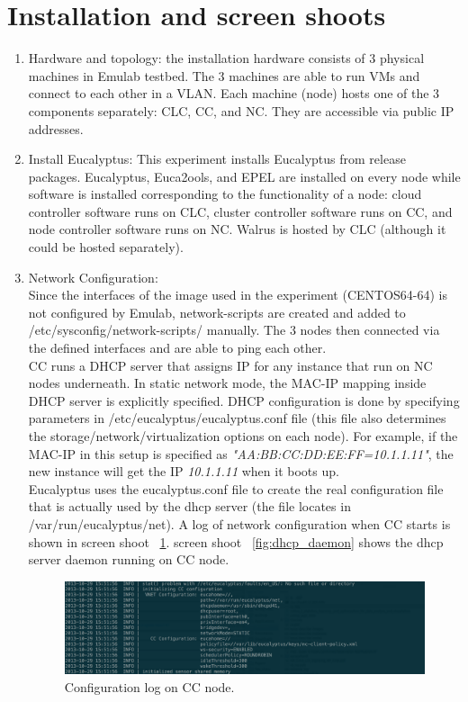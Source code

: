 \section{Installation and screen shoots}
\begin{enumerate}
	\item Hardware and topology: the installation hardware 
		consists of 3 physical machines in Emulab testbed. 
		The 3 machines are able to run VMs and connect to 
		each other in a VLAN. Each machine (node) hosts one of the 3 
		components separately: CLC, CC, and NC. They are accessible via public 
		IP addresses.
	\item Install Eucalyptus: This experiment installs Eucalyptus 
		from release packages. Eucalyptus, Euca2ools, and EPEL 
		are installed on every node while software is installed 
		corresponding to the functionality of a node: cloud controller 
		software runs on CLC, cluster controller software runs on 
		CC, and node controller software runs on NC. Walrus is 
		hosted by CLC (although it could be hosted separately).
	\item Network Configuration:\\
		Since the interfaces of the image used in the experiment 
		(CENTOS64-64) is not configured by Emulab, network-scripts are created 
		and added to /etc/sysconfig/network-scripts/ manually. The 3 nodes 
		then connected via the defined interfaces and are able to ping each 
		other.\\
		CC runs a DHCP server that assigns IP for 
		any instance that run on NC nodes underneath. In static network mode, 
		the MAC-IP mapping inside DHCP server is explicitly specified. DHCP configuration 
		is done by specifying parameters in /etc/eucalyptus/eucalyptus.conf file 
		(this file also determines the storage/network/virtualization options on each node). 
		For example, if the MAC-IP in this setup is specified as
		\textit{"AA:BB:CC:DD:EE:FF=10.1.1.11"}, the new instance will get the IP 
		\textit{10.1.1.11} when it boots up.\\
		Eucalyptus uses the eucalyptus.conf file to create the real configuration file 
		that is actually used by the dhcp server (the file locates in /var/run/eucalyptus/net). 
		A log of network configuration when CC starts is shown in screen shoot ~\ref{fig:cc_network}. 
		screen shoot ~\ref{fig:dhcp_daemon} shows the dhcp server daemon running on CC node.
		\begin{figure}[hbtp]
			\centering
			\includegraphics[scale=0.14]{cc-network.png}
			\caption{ Configuration log on CC node.
			}
			\label{fig:cc_network}
		\end{figure}


\end{enumerate}
